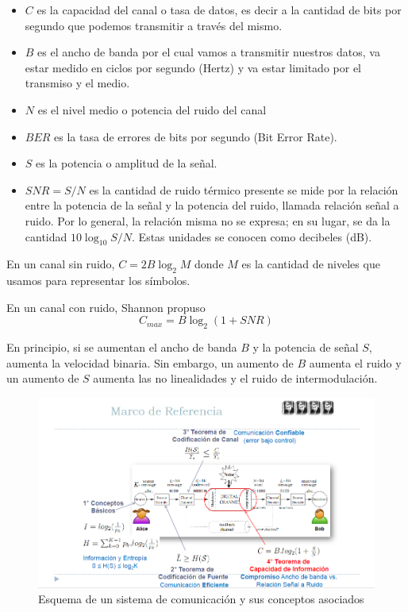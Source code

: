 \begin{itemize}
  \item \(C\) es la capacidad del canal o tasa de datos, es decir a la cantidad de bits por segundo que podemos transmitir a través del mismo.
  \item \(B\) es el ancho de banda por el cual vamos a transmitir nuestros datos, va estar medido en ciclos por segundo (Hertz) y va estar limitado por el transmiso y el medio.
  \item \(N\) es el nivel medio o potencia del ruido del canal
  \item \(BER\) es la tasa de errores de bits por segundo (Bit Error Rate).
  \item \(S\) es la potencia o amplitud de la señal.
  \item \(SNR = S / N\) es la cantidad de ruido térmico presente se mide por la relación entre la potencia de la señal y la potencia del ruido, llamada relación señal a ruido. Por lo general, la relación misma no se expresa; en su lugar, se da la cantidad \(10 \log_{10} S/N\).
  Estas unidades se conocen como decibeles (dB).
\end{itemize}

En un canal sin ruido, \(C = 2B\log_2 M\) donde \(M\) es la cantidad de niveles que usamos para representar los símbolos.

En un canal con ruido, Shannon propuso
\[C_{max} = B\log_2(1 + SNR)\]

En principio, si se aumentan el ancho de banda \(B\) y la potencia de señal \(S\), aumenta la velocidad binaria. Sin embargo, un aumento de \(B\) aumenta el ruido y un aumento de \(S\) aumenta las no linealidades y el ruido de intermodulación.

\begin{figure}[H]
	\centering
	\includegraphics[width=\textwidth
]{images/marco-referencia.png}
	\caption[Esquema de un sistema de comunicación y sus conceptos asociados]{Esquema de un sistema de comunicación y sus conceptos asociados}
	\label{fig:marco-referencai}
\end{figure}


